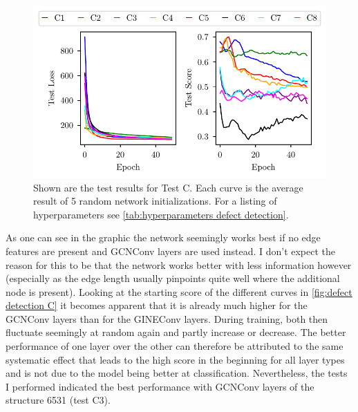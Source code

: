 \documentclass[11pt,a4paper]{article}
\begin{document}
\begin{figure}[htbp]
\centering
\includegraphics{images/plots/defect_detection_C.pdf}
\caption{Shown are the test results for Test C. Each curve is the average result of 5 random network initializations. For a listing of hyperparameters see \autoref{tab:hyperparameters defect detection}.}
\label{fig:defect detection C}
\end{figure}

As one can see in the graphic the network seemingly works best if no edge features are present and GCNConv layers are used instead. 
I don't expect the reason for this to be that the network works better with less information however (especially as the edge length usually pinpoints quite well where the additional node is present). 
Looking at the starting score of the different curves in \autoref{fig:defect detection C} it becomes apparent that it is already much higher for the GCNConv layers than for the GINEConv layers. 
During training, both then fluctuate seemingly at random again and partly increase or decrease. 
The better performance of one layer over the other can therefore be attributed to the same systematic effect that leads to the high score in the beginning for all layer types and is not due to the model being better at classification. 
Nevertheless, the tests I performed indicated the best performance with GCNConv layers of the structure 6531 (test C3). \\
\end{document}
